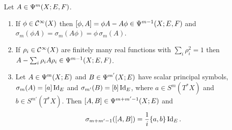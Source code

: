 \begin{proposition}\label{manifolds:prop:symbol-calculus}
Let $A\in\Psi^{m}(X;E,F)$.
\begin{enumerate}[label=\textup{(\alph*)}]
\item If $\phi\in\mathcal{C}^\infty(X)$ then $[\phi,A]=\phi A-A\phi\in\Psi^{m-1}(X;E,F)$ and
$\sigma_m(\phi A)=\sigma_m(A\phi)=\phi\,\sigma_m(A)$.
\item If $\rho_i\in\mathcal{C}^\infty(X)$ are finitely many real functions with
$\sum_i\rho_i^2=1$ then $A-\sum_i\rho_iA\rho_i\in\Psi^{m-1}(X;E,F)$.
\item Let $A\in\Psi^{m}(X;E)$ and $B\in\Psi^{m'}(X;E)$ have scalar principal
symbols, $\sigma_m(A)=[a]\operatorname{Id}_E$ and $\sigma_{m'}(B)=[b]\operatorname{Id}_E$, where
$a\in S^m(T^*X)$ and $b\in S^{m'}(T^*X)$. Then $[A,B]\in\Psi^{m+m'-1}(X;E)$ and
\begin{equation*}
\sigma_{m+m'-1}([A,B])=\frac1i\{a,b\}\operatorname{Id}_E .
\end{equation*}
\end{enumerate}
\end{proposition}
